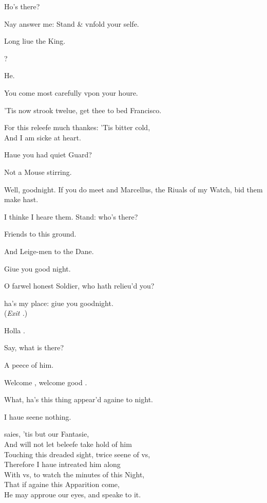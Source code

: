 \documentclass[a5paper,DIV=calc,11pt]{scrbook}
\begin{document}

\begin{drama*}
    \barnspeaks Ho's there?

    \franspeaks Nay answer me: Stand \& vnfold your selfe.

    \barnspeaks Long liue the King.
    
    \franspeaks \barn?

    \barnspeaks He.

    \franspeaks You come most carefully vpon your houre.

    \barnspeaks 'Tis now strook twelue, get thee to bed Francisco.

    \franspeaks For this releefe much thankes: 'Tis bitter cold,\\
    And I am sicke at heart.

    \barnspeaks Haue you had quiet Guard?

    \franspeaks Not a Mouse stirring.

    \barnspeaks Well, goodnight. If you do meet \hor and \mar Marcellus, the Riuals of my Watch, bid them make hast.


    \franspeaks I thinke I heare them. Stand: who's there?

    \horspeaks Friends to this ground.

    \marspeaks And Leige-men to the Dane.

    \franspeaks Giue you good night.

    \marspeaks O farwel honest Soldier, who hath relieu'd you?

    \franspeaks \barn ha's my place: giue you goodnight.\\(\textit{Exit \fran.})

    \marspeaks Holla \barn.

    \barnspeaks Say, what is \hor there?

    \horspeaks A peece of him.
    
    \barnspeaks Welcome \hor, welcome good \mar.

    \marspeaks What, ha's this thing appear'd againe to night.

    \barnspeaks I haue seene nothing.

    \marspeaks \hor saies, 'tis but our Fantasie,\\
    And will not let beleefe take hold of him\\
    Touching this dreaded sight, twice seene of vs,\\
    Therefore I haue intreated him along\\
    With vs, to watch the minutes of this Night,\\
    That if againe this Apparition come,\\
    He may approue our eyes, and speake to it.


\end{drama*}
\end{document}
